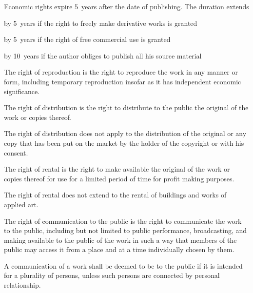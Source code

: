 \begin{contract}
\Sentence Economic rights expire 5~years after the date of publishing. The duration extends
\begin{legalenum}
	\item by 5~years if the right to  freely make derivative works is granted
	\item by 5~years if  the right of free commercial use is granted
	\item by 10~years if  the author obliges to publish all his source material
\end{legalenum}

\label{Par:RightOfReproduction}
\Sentence The right of reproduction is the right to reproduce the work in any manner 
or form, including temporary reproduction insofar as it has independent 
economic significance.

\label{Par:RightOfDistribution}
\Sentence The right of distribution is the right to distribute to the public the original 
of the work or copies thereof.

\Sentence The right of distribution does not apply to the distribution of the original 
or any copy that has been put on the market by the holder of the copyright 
or with his consent.

\label{Par:RightOfRental}
\Sentence The right of rental is the right to make available the original of the work 
or copies thereof for use for a limited period of time for profit making 
purposes.

\Sentence The right of rental does not extend to the rental of buildings and works of 
applied art.

\label{Par:RightOfCommunicationToThePublic}
\Sentence  The right of communication to the public is the right to communicate the 
work to the public, including but not limited to public performance, 
broadcasting, and making available to the public of the work in such a 
way that members of the public may access it from a place and at a time 
individually chosen by them.

\Sentence  A communication of a work shall be deemed to be to the public if it is 
intended for a plurality of persons, unless such persons are connected by 
personal relationship.


\end{contract}
